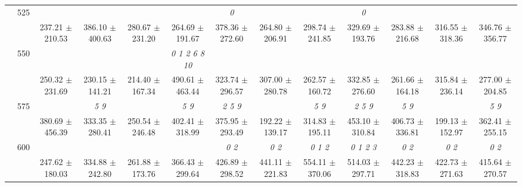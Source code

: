 \begin{table}[h]
{\begin{tabular}{
        ccccccccccccc}
 & \multirow{2}{*}{525}& \cellcolor[HTML]{EFEFEF} & \cellcolor[HTML]{EFEFEF} & \cellcolor[HTML]{EFEFEF} & \cellcolor[HTML]{EFEFEF} & \cellcolor[HTML]{EFEFEF} \textit{ 0 }& \cellcolor[HTML]{EFEFEF} & \cellcolor[HTML]{EFEFEF} & \cellcolor[HTML]{EFEFEF} \textit{ 0 }& \cellcolor[HTML]{EFEFEF} & \cellcolor[HTML]{EFEFEF} & \cellcolor[HTML]{EFEFEF}  \\ 
 & & \cellcolor[HTML]{EFEFEF} 237.21 $\pm$ 210.53& \cellcolor[HTML]{EFEFEF} 386.10 $\pm$ 400.63& \cellcolor[HTML]{EFEFEF} 280.67 $\pm$ 231.20& \cellcolor[HTML]{EFEFEF} 264.69 $\pm$ 191.67& \cellcolor[HTML]{EFEFEF} 378.36 $\pm$ 272.60& \cellcolor[HTML]{EFEFEF} 264.80 $\pm$ 206.91& \cellcolor[HTML]{EFEFEF} 298.74 $\pm$ 241.85& \cellcolor[HTML]{EFEFEF} 329.69 $\pm$ 193.76& \cellcolor[HTML]{EFEFEF} 283.88 $\pm$ 216.68& \cellcolor[HTML]{EFEFEF} 316.55 $\pm$ 318.36& \cellcolor[HTML]{EFEFEF} 346.76 $\pm$ 356.77 \\ 
 & \multirow{2}{*}{550}& & & & \textit{  0  1  2  6  8 10 }& & & & & & &  \\ 
 & & 250.32 $\pm$ 231.69& 230.15 $\pm$ 141.21& 214.40 $\pm$ 167.34& 490.61 $\pm$ 463.44& 323.74 $\pm$ 296.57& 307.00 $\pm$ 280.78& 262.57 $\pm$ 160.72& 332.85 $\pm$ 276.60& 261.66 $\pm$ 164.18& 315.84 $\pm$ 236.14& 277.00 $\pm$ 204.85 \\ 
 & \multirow{2}{*}{575}& \cellcolor[HTML]{EFEFEF} & \cellcolor[HTML]{EFEFEF} \textit{ 5 9 }& \cellcolor[HTML]{EFEFEF} & \cellcolor[HTML]{EFEFEF} \textit{ 5 9 }& \cellcolor[HTML]{EFEFEF} \textit{ 2 5 9 }& \cellcolor[HTML]{EFEFEF} & \cellcolor[HTML]{EFEFEF} \textit{ 5 9 }& \cellcolor[HTML]{EFEFEF} \textit{ 2 5 9 }& \cellcolor[HTML]{EFEFEF} \textit{ 5 9 }& \cellcolor[HTML]{EFEFEF} & \cellcolor[HTML]{EFEFEF} \textit{ 5 9 } \\ 
 & & \cellcolor[HTML]{EFEFEF} 380.69 $\pm$ 456.39& \cellcolor[HTML]{EFEFEF} 333.35 $\pm$ 280.41& \cellcolor[HTML]{EFEFEF} 250.54 $\pm$ 246.48& \cellcolor[HTML]{EFEFEF} 402.41 $\pm$ 318.99& \cellcolor[HTML]{EFEFEF} 375.95 $\pm$ 293.49& \cellcolor[HTML]{EFEFEF} 192.22 $\pm$ 139.17& \cellcolor[HTML]{EFEFEF} 314.83 $\pm$ 195.11& \cellcolor[HTML]{EFEFEF} 453.10 $\pm$ 310.84& \cellcolor[HTML]{EFEFEF} 406.73 $\pm$ 336.81& \cellcolor[HTML]{EFEFEF} 199.13 $\pm$ 152.97& \cellcolor[HTML]{EFEFEF} 362.41 $\pm$ 255.15 \\ 
 & \multirow{2}{*}{600}& & & & & \textit{ 0 2 }& \textit{ 0 2 }& \textit{ 0 1 2 }& \textit{ 0 1 2 3 }& \textit{ 0 2 }& \textit{ 0 2 }& \textit{ 0 2 } \\ 
 & & 247.62 $\pm$ 180.03& 334.88 $\pm$ 242.80& 261.88 $\pm$ 173.76& 366.43 $\pm$ 299.64& 426.89 $\pm$ 298.52& 441.11 $\pm$ 221.83& 554.11 $\pm$ 370.06& 514.03 $\pm$ 297.71& 442.23 $\pm$ 318.83& 422.73 $\pm$ 271.63& 415.64 $\pm$ 270.57 \\ 

\end{tabular}}
\end{table}
